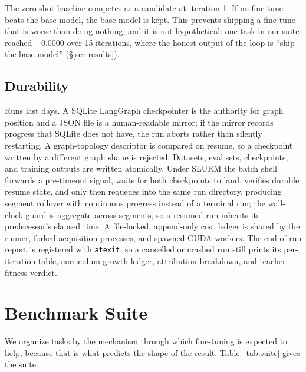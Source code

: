\documentclass[sigconf,10pt]{acmart}
\newcommand{\xref}[1]{\S\ref{#1}}
\begin{document}
The zero-shot baseline competes as a candidate at iteration 1. If no fine-tune beats the base
model, the base model is kept. This prevents shipping a fine-tune that is worse than doing
nothing, and it is not hypothetical: one task in our suite reached $+0.0000$ over 15
iterations, where the honest output of the loop is ``ship the base model''
(\xref{sec:results}).

\subsection{Durability}

Runs last days. A SQLite LangGraph checkpointer is the authority for graph position and a
JSON file is a human-readable mirror; if the mirror records progress that SQLite does not
have, the run aborts rather than silently restarting. A graph-topology descriptor is compared
on resume, so a checkpoint written by a different graph shape is rejected. Datasets, eval
sets, checkpoints, and training outputs are written atomically. Under SLURM the batch shell
forwards a pre-timeout signal, waits for both checkpoints to land, verifies durable resume
state, and only then requeues into the same run directory, producing segment rollover with
continuous progress instead of a terminal run; the wall-clock guard is aggregate across
segments, so a resumed run inherits its predecessor's elapsed time. A file-locked,
append-only cost ledger is shared by the runner, forked acquisition processes, and spawned
CUDA workers. The end-of-run report is registered with \texttt{atexit}, so a cancelled or
crashed run still prints its per-iteration table, curriculum growth ledger, attribution
breakdown, and teacher-fitness verdict.

\section{Benchmark Suite}
\label{sec:suite}

We organize tasks by the mechanism through which fine-tuning is expected to help, because
that is what predicts the shape of the result. Table~\ref{tab:suite} gives the suite.
\end{document}
